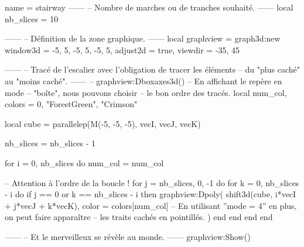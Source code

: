 \documentclass{standalone}
\begin{document}
\begin{luadraw}{name = stairway}
------
-- Nombre de marches ou de tranches souhaité.
------
local nb_slices = 10

------
-- Définition de la zone graphique.
------
local graphview = graph3d:new{
  window3d = {-5, 5, -5, 5, -5, 5},
  adjust2d = true,
  viewdir  = {-35, 45}
}

------
-- Tracé de l'escalier avec l'obligation de tracer les éléments
-- du "plus caché" au "moins caché".
------
-- graphview:Dboxaxes3d()  -- En affichant le repère en mode
                        -- "boîte", nous pouvons choisir
                        -- le bon ordre des tracés.
local num_col, colors = 0, {"ForestGreen", "Crimson"}

local cube = parallelep(M(-5, -5, -5), vecI, vecJ, vecK)

nb_slices = nb_slices - 1

for i = 0, nb_slices do
  num_col = num_col%

-- Attention à l'ordre de la boucle !
  for j = nb_slices, 0, -1 do
    for k = 0, nb_slices - i do
      if j == 0 or k == nb_slices - i then
        graphview:Dpoly(
          shift3d(cube, i*vecI + j*vecJ + k*vecK),
          {
            color = colors[num_col]
-- En utilisant ''mode = 4'' en plus, on peut faire apparaître
-- les traits cachés en pointillés.
          })
      end
    end
  end
end

------
-- Et le merveilleux se révèle au monde.
------
graphview:Show()
\end{luadraw}
\end{document}
